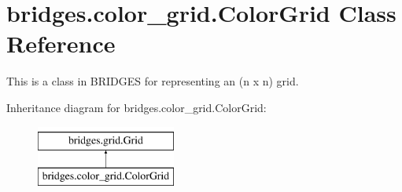 \hypertarget{classbridges_1_1color__grid_1_1_color_grid}{}\section{bridges.\+color\+\_\+grid.\+Color\+Grid Class Reference}
\label{classbridges_1_1color__grid_1_1_color_grid}


This is a class in B\+R\+I\+D\+G\+ES for representing an (n x n) grid.  


Inheritance diagram for bridges.\+color\+\_\+grid.\+Color\+Grid\+:\begin{figure}[H]
\begin{center}
\leavevmode
\includegraphics[height=2.000000cm]{classbridges_1_1color__grid_1_1_color_grid}
\end{center}
\end{figure}
